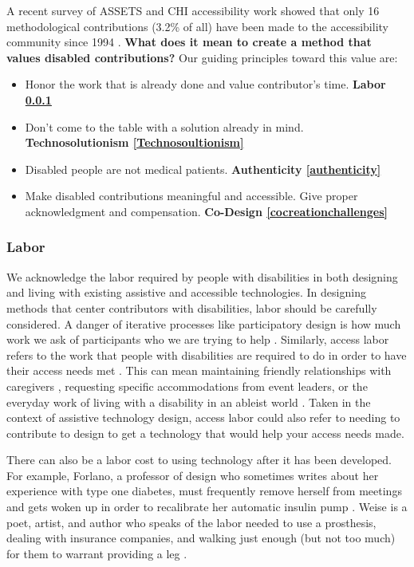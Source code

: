 A recent survey of ASSETS and CHI accessibility work showed that only 16 methodological contributions (3.2\% of all)  have been made to the accessibility community since 1994  \cite{mackWhatWeMean2021}.
\textbf{What does it mean to create a method that values disabled contributions? } Our guiding principles toward this value are:
\begin{itemize}
\item Honor the work that is already done and value contributor's time. \textbf{Labor \ref{Labor}}
\item Don't come to the table with a solution already in mind. \textbf{Technosolutionism \ref{Technosoultionism}}
\item Disabled people are not medical patients. \textbf{Authenticity \ref{authenticity}}
\item Make disabled contributions meaningful and accessible. Give proper acknowledgment and compensation. \textbf{Co-Design \ref{cocreationchallenges}}
\end{itemize}


\subsubsection{Labor} \label{Labor}

We acknowledge the labor required by people with disabilities in both designing and living with existing assistive and accessible technologies. In designing methods that center contributors with disabilities, labor should be carefully considered. A danger of iterative processes like participatory design is how much work we ask of participants who we are trying to help \cite{dourishBeingIteratedAffective2020}. Similarly, access labor refers to the work that people with disabilities are required to do in order to have their access needs met \cite{bennettBiographicalPrototypesReimagining2019,mackWhatWeMean2021,piepzna-samarasinhaCareWorkDreaming2018}. This can mean maintaining friendly relationships with caregivers \cite{kittayLoveLaborEssays1999}, requesting specific accommodations from event leaders, or the everyday work of living with a disability in an ableist world \cite{hanssonEthicsEnablingTechnology2007a}. Taken in the context of assistive technology design, access labor could also refer to needing to contribute to design to get a technology that would help your access needs made. 

There can also be a labor cost to using technology after it has been developed. For example, Forlano, a professor of design who sometimes writes about her experience with type one diabetes, must frequently remove herself from meetings and gets woken up in order to recalibrate her automatic insulin pump \cite{forlanoDangerIntimateAlgorithms2019}. Weise is a poet, artist, and author who speaks of the labor needed to use a prosthesis, dealing with insurance companies, and walking just enough (but not too much) for them to warrant providing a leg \cite{weiseCommonCyborg2018}. 

